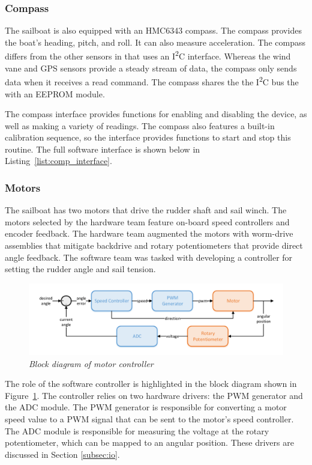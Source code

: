 \documentclass[12pt]{article}
\newcommand{\IIC}{I\textsuperscript{2}C }
\begin{document}
\subsubsection{Compass}
The sailboat is also equipped with an HMC6343 compass. The compass provides the boat's heading, pitch, and roll. It can also measure acceleration. The compass differs from the other sensors in that uses an \IIC interface. Whereas the wind vane and GPS sensors provide a steady stream of data, the compass only sends data when it receives a read command. The compass shares the the \IIC bus the with an EEPROM module.

The compass interface provides functions for enabling and disabling the device, as well as making a variety of readings. The compass also features a built-in calibration sequence, so the interface provides functions to start and stop this routine. The full software interface is shown below in Listing~\ref{list:comp_interface}.

\subsubsection{Motors}
The sailboat has two motors that drive the rudder shaft and sail winch. The motors selected by the hardware team feature on-board speed controllers and encoder feedback. The hardware team augmented the motors with worm-drive assemblies that mitigate backdrive and rotary potentiometers that provide direct angle feedback. The software team was tasked with developing a controller for setting the rudder angle and sail tension.

\begin{figure}[h]
	\centering
	\includegraphics[width=\textwidth]{figures/motor_block.pdf}
	\caption[Block diagram of motor controller]{\textsl{Block diagram of motor controller}}
	\label{fig:motor_block}
\end{figure}

The role of the software controller is highlighted in the block diagram shown in Figure~\ref{fig:motor_block}. The controller relies on two hardware drivers: the PWM generator and the ADC module. The PWM generator is responsible for converting a motor speed value to a PWM signal that can be sent to the motor's speed controller. The ADC module is responsible for measuring the voltage at the rotary potentiometer, which can be mapped to an angular position. These drivers are discussed in Section \ref{subsec:io}.
\end{document}
